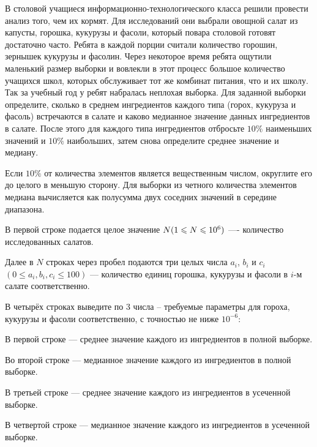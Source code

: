 
В столовой учащиеся информационно-технологического класса решили провести анализ того, чем их кормят. Для исследований они выбрали овощной салат из капусты, горошка, кукурузы и фасоли, который повара столовой готовят достаточно часто. Ребята в каждой порции считали количество горошин, зернышек кукурузы и фасолин. Через некоторое время ребята ощутили маленький размер выборки и вовлекли в этот процесс большое количество учащихся школ, которых обслуживает тот же комбинат питания, что и их школу. Так за учебный год у ребят набралась неплохая выборка. Для заданной выборки определите, сколько в среднем ингредиентов каждого типа (горох, кукуруза и фасоль) встречаются в салате и каково медианное значение данных ингредиентов в салате. После этого для каждого типа ингредиентов отбросьте $10\%$  наименьших значений и $10\%$  наибольших, затем снова определите среднее значение и медиану.

\explanationSection

Если $10\%$ от количества элементов является вещественным числом, округлите его до целого в меньшую сторону. Для выборки из четного количества элементов медиана вычисляется как полусумма двух соседних значений в середине диапазона.


В первой строке подается целое значение $ N \space (1 \leq N \leq 10^6) $ —- количество исследованных салатов. 

Далее в $ N $ строках через пробел подаются три целых числа $ a_i $, $ b_i $ и $ c_i$ \linebreak $(0 \leq a_i, b_i, c_i \leq 100) $ — количество единиц горошка, кукурузы и фасоли в $i$-м салате соответственно.

\outputfmtSection

В четырёх строках выведите по 3 числа -- требуемые параметры для гороха, кукурузы и фасоли соответственно, с точностью не ниже $10^{-6}$:

В первой строке — среднее значение каждого из ингредиентов в полной выборке.

Во второй строке — медианное значение каждого из ингредиентов в полной выборке.

В третьей строке — среднее значение каждого из ингредиентов в усеченной выборке.

В четвертой строке — медианное значение каждого из ингредиентов в усеченной выборке.

\markSection


